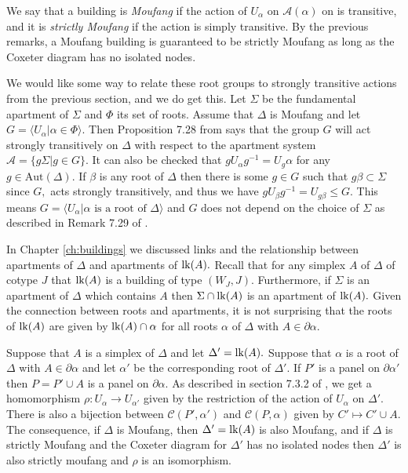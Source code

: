 \documentclass[class=book, crop=false,12 pt]{standalone}
\begin{document}
We say that a building is \emph{Moufang} if the action of $U_\alpha$ on $\mathcal{A}(\alpha)$ on is transitive, and it is \emph{strictly Moufang} if the action is simply transitive. By the previous remarks, a Moufang building is guaranteed to be strictly Moufang as long as the Coxeter diagram has no isolated nodes. 

We would like some way to relate these root groups to strongly transitive actions from the previous section, and we do get this. Let $\Sigma$ be the fundamental apartment of $\Sigma$ and $\Phi$ its set of roots. Assume that $\Delta$ is Moufang and let $G=\langle U_\alpha|\alpha\in \Phi\rangle.$ Then Proposition 7.28 from \cite{buildings} says that the group $G$ will act strongly transitively on $\Delta$ with respect to the apartment system $\mathcal{A}=\{g\Sigma|g\in G\}.$ It can also be checked that $gU_\alpha g^{-1}=U_g\alpha$ for any $g\in \mathrm{Aut}(\Delta).$ If $\beta$ is any root of $\Delta$ then there is some $g\in G$ such that $g\beta\subset \Sigma$ since $G,$ acts strongly transitively, and thus we have $gU_\beta g^{-1}=U_{g\beta}\le G.$ This means $G=\langle U_{\alpha}|\alpha \text{ is a root of }\Delta\rangle$ and $G$ does not depend on the choice of $\Sigma$ as described in Remark 7.29 of \cite{buildings}.

In Chapter \ref{ch:buildings} we discussed links and the relationship between apartments of $\Delta$ and apartments of $\mathrm{lk}(A).$ Recall that for any simplex $A$ of $\Delta$ of cotype $J$ that $\mathrm{lk}(A)$ is a building of type $(W_J,J).$ Furthermore, if $\Sigma$ is an apartment of $\Delta$ which contains $A$ then $\Sigma\cap \mathrm{lk}(A)$ is an apartment of $\mathrm{lk}(A).$ Given the connection between roots and apartments, it is not surprising that the roots of $\mathrm{lk}(A)$ are given by $\mathrm{lk}(A)\cap \alpha$ for all roots $\alpha$ of $\Delta$ with $A\in \partial \alpha.$

Suppose that $A$ is a simplex of $\Delta$ and let $\Delta'=\mathrm{lk}(A).$ Suppose that $\alpha$ is a root of $\Delta$ with $A\in \partial \alpha$ and let $\alpha'$ be the corresponding root of $\Delta'.$ If $P'$ is a panel on $\partial \alpha'$ then $P=P'\cup A$ is a panel on $\partial \alpha.$ As described in section 7.3.2 of \cite{buildings}, we get a homomorphism $\rho:U_\alpha \to U_{\alpha'}$ given by the restriction of the action of $U_{\alpha}$ on $\Delta'.$ There is also a bijection between $\mathcal{C}(P',\alpha')$ and $\mathcal{C}(P,\alpha)$ given by $C'\mapsto C'\cup A.$ The consequence, if $\Delta$ is Moufang, then $\Delta'=\mathrm{lk}(A)$ is also Moufang, and if $\Delta$ is strictly Moufang and the Coxeter diagram for $\Delta'$ has no isolated nodes then $\Delta'$ is also strictly moufang and $\rho$ is an isomorphism. 
\end{document}
